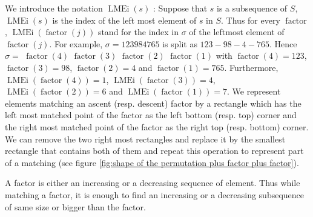 \documentclass[a4paper]{llncs}
\DeclareMathOperator{\LMEi}{LMEi}
\DeclareMathOperator{\factor}{factor}
\begin{document}
We introduce the notation $\LMEi(s)$ : Suppose that $s$ is a subsequence of $S$, $\LMEi(s)$ is the index of the left most element of $s$ in $S$. Thus
for every $\factor$, $\LMEi(\factor(j))$ stand for the index in $\sigma$
of the leftmost element of $\factor(j)$.
For example,
$\sigma = 123984765$ is split as
 $123-98-4-765$. 
Hence
$\sigma =$ $\factor(4)$ $\factor(3)$ $\factor(2)$ $\factor(1)$ with
$\factor(4) =123$, $\factor(3) = 98$, $\factor(2) = 4$ and $\factor(1) = 765$.
Furthermore,
$\LMEi(\factor(4)) = 1$, $\LMEi(\factor(3)) = 4$, $\LMEi(\factor(2)) = 6$ and $\LMEi(\factor(1)) = 7$.
We represent elements matching an ascent (resp. descent) factor 
by a rectangle which has the left most matched point of the factor as the left bottom (resp. top) corner and the right most matched point of the factor as the right top (resp. bottom) corner.
We can remove the two right most rectangles and replace it by the smallest rectangle that contains both of them and repeat this operation to represent part of a matching (see figure \ref{fig:shape of the permutation plus factor plus factor}).

\begin{remark}
A factor is either an increasing or a decreasing sequence of element. Thus while matching a factor, it is enough to find an increasing or a decreasing subsequence of same size or bigger than the factor.
\end{remark}
\end{document}
